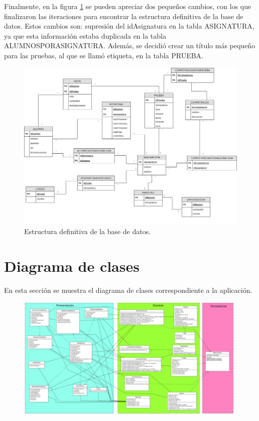\newpage
Finalmente, en la figura \ref{Fig:ADB_Definition_6} se pueden apreciar dos pequeños cambios, con los que finalizaron las iteraciones para encontrar la estructura definitiva de la base de datos. Estos cambios son: supresión del idAsignatura en la tabla ASIGNATURA, ya que esta información estaba duplicada en la tabla ALUMNOSPORASIGNATURA. Además, se decidió crear un título más pequeño para las pruebas, al que se llamó etiqueta, en la tabla PRUEBA.

\begin{figure}[H]
\centering\includegraphics[width=1\linewidth]{figs/DB_Definition_6.png}
\caption{Estructura definitiva de la base de datos.}
\label{Fig:ADB_Definition_6}
\end{figure}

\newpage

\section{Diagrama de clases}
\label{ana:clases}
En esta sección se muestra el diagrama de clases correspondiente a la aplicación.

\begin{figure}
  \centering
  \includegraphics[width=1\linewidth]{figs/ClassDiagram.png}
\end{figure}

